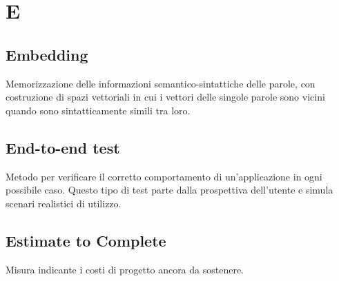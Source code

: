 \chapter{E}
\section{Embedding}\label{sec:Embeddings}
Memorizzazione delle informazioni semantico-sintattiche delle parole, con costruzione di spazi vettoriali in cui i vettori delle singole parole sono vicini quando sono sintatticamente simili tra loro.

\section{End-to-end test}
Metodo per verificare il corretto comportamento di un'applicazione in ogni possibile caso. Questo tipo di test parte dalla prospettiva dell'utente e simula scenari realistici di utilizzo.

\section{Estimate to Complete}
Misura indicante i costi di progetto ancora da sostenere.

